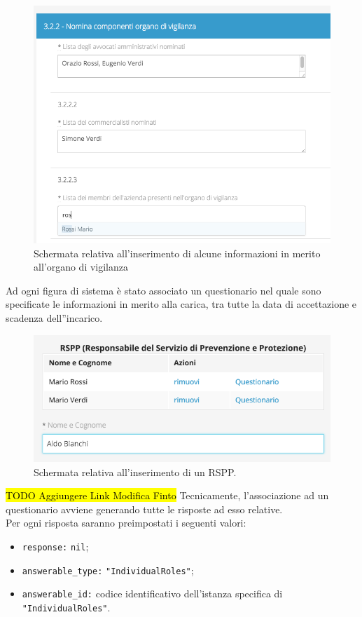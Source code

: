 	\begin{figure}[H]
		\begin{center}
			\includegraphics[width=12cm]{Pics/screen_organo_di_vigianza_con_autocompletamento.png}
			\caption{
				Schermata relativa all'inserimento di alcune informazioni in merito all'organo di vigilanza}
			\label{fig:ScreenOrganodiVigilanza}
		\end{center}
	\end{figure}
	
	Ad ogni figura di sistema è stato associato un questionario nel quale sono specificate le informazioni in merito alla carica, tra tutte la data di accettazione e scadenza dell''incarico.
	\begin{figure}[H]
		\begin{center}
			\includegraphics[width=12cm]{Pics/RemoteTrueRSPP.png}
			\caption{
				Schermata relativa all'inserimento di un RSPP.}
			\label{fig:ScreenRSPP}
		\end{center}
	\end{figure}	
		\hl{TODO Aggiungere Link Modifica Finto}
	 Tecnicamente, l'associazione ad un questionario avviene generando tutte le risposte ad esso relative.\\
	  Per ogni risposta saranno preimpostati i seguenti valori:
	  \begin{itemize}
		  \item \texttt{response:} \texttt{nil};
		  \item \texttt{answerable\_type:} \texttt{"IndividualRoles"};
		  \item \texttt{answerable\_id:} codice identificativo dell'istanza specifica di \texttt{"IndividualRoles"}.
	  \end{itemize}

